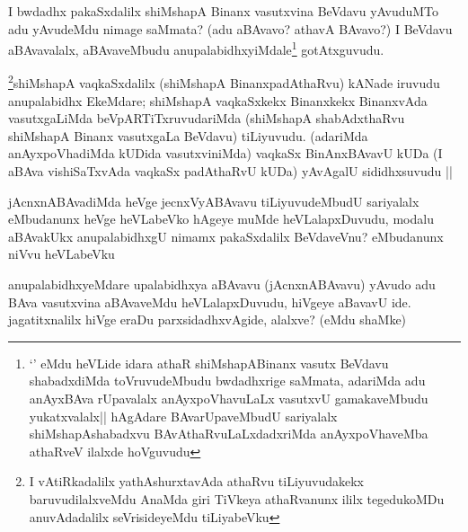 
\begin{artha}
I bwdadhx pakaSxdalilx shiMshapA Binanx vasutxvina BeVdavu yAvuduMTo adu yAvudeMdu nimage saMmata? (adu aBAvavo? athavA BAvavo?) I BeVdavu aBAvavalalx, aBAvaveMbudu anupalabidhxyiMdale\footnote[1]{`\stext' eMdu heVLide idara athaR shiMshapABinanx vasutx BeVdavu shabadxdiMda toVruvudeMbudu bwdadhxrige saMmata, adariMda adu anAyxBAva rUpavalalx anAyxpoVhavuLaLx vasutxvU gamakaveMbudu yukatxvalalx|| hAgAdare BAvarUpaveMbudU sariyalalx shiMshapAshabadxvu BAvAthaRvuLaLxdadxriMda anAyxpoVhaveMba athaRveV ilalxde hoVguvudu} gotAtxguvudu.
\end{artha}


\begin{artha}
\footnote[1]{I vAtiRkadalilx yathAshurxtavAda athaRvu tiLiyuvudakekx baruvudilalxveMdu AnaMda giri TiVkeya athaRvanunx ililx tegedukoMDu anuvAdadalilx seVrisideyeMdu tiLiyabeVku}shiMshapA vaqkaSxdalilx (shiMshapA BinanxpadAthaRvu) kANade iruvudu anupalabidhx EkeMdare; shiMshapA vaqkaSxkekx Binanxkekx BinanxvAda vasutxgaLiMda beVpARTiTxruvudariMda (shiMshapA shabAdxthaRvu shiMshapA Binanx vasutxgaLa BeVdavu) tiLiyuvudu. (adariMda anAyxpoVhadiMda kUDida vasutxviniMda) vaqkaSx BinAnxBAvavU kUDa (I aBAva vishiSaTxvAda vaqkaSx padAthaRvU kUDa) yAvAgalU sididhxsuvudu ||
\end{artha}


\begin{artha}
jAcnxnABAvadiMda heVge jecnxVyABAvavu tiLiyuvudeMbudU sariyalalx eMbudanunx heVge heVLabeVko hAgeye muMde heVLalapxDuvudu, modalu aBAvakUkx anupalabidhxgU nimamx pakaSxdalilx BeVdaveVnu? eMbudanunx niVvu heVLabeVku
\end{artha}


\begin{artha}
anupalabidhxyeMdare upalabidhxya aBAvavu (jAcnxnABAvavu) yAvudo adu BAva vasutxvina aBAvaveMdu heVLalapxDuvudu, hiVgeye aBavavU ide. jagatitxnalilx hiVge eraDu parxsidadhxvAgide, alalxve? (eMdu shaMke)
\end{artha}

